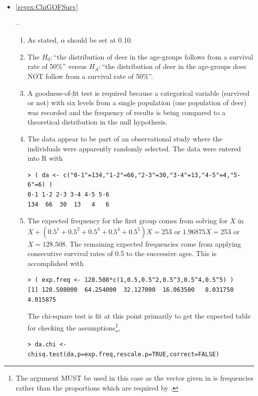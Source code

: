 \documentclass[10pt,openany]{book}\usepackage[]{graphicx}\usepackage[]{color}
\makeatletter
\newenvironment{kframe}{%
 \def\at@end@of@kframe{}%
 \ifinner\ifhmode%
  \def\at@end@of@kframe{\end{minipage}}%
  \begin{minipage}{\columnwidth}%
 \fi\fi%
 \def\FrameCommand##1{\hskip\@totalleftmargin \hskip-\fboxsep
 \colorbox{shadecolor}{##1}\hskip-\fboxsep
     \hskip-\linewidth \hskip-\@totalleftmargin \hskip\columnwidth}%
 \MakeFramed {\advance\hsize-\width
   \@totalleftmargin\z@ \linewidth\hsize
   \@setminipage}}%
 {\par\unskip\endMakeFramed%
 \at@end@of@kframe}
\newenvironment{knitrout}{}{} %
\makeatother
\begin{document}
\begin{itemize}
  \item \hypertarget{ans:ChiGOFSurv}{\ref{revex:ChiGOFSurv}} --
    \begin{enumerate}
      \item As stated, $\alpha$ should be set at 0.10.
      \item The $H_{0}:$``the distribution of deer in the age-groups follows from a survival rate of 50\%'' versus $H_{A}:$``the distribution of deer in the age-groups does NOT follow from a survival rate of 50\%''.
      \item A goodness-of-fit test is required because a categorical variable (survived or not) with six levels from a single population (one population of deer) was recorded and the frequency of results is being compared to a theoretical distribution in the null hypothesis.
      \item The data appear to be part of an observational study where the individuals were apparently randomly selected.  The data were entered into R with
\begin{knitrout}
\color{fgcolor}\begin{kframe}
\begin{verbatim}
> ( da <- c("0-1"=134,"1-2"=66,"2-3"=30,"3-4"=13,"4-5"=4,"5-6"=6) )
0-1 1-2 2-3 3-4 4-5 5-6 
134  66  30  13   4   6 
\end{verbatim}
\end{kframe}
\end{knitrout}
      \item The expected frequency for the first group comes from solving for $X$ in $X+(0.5^{1}+0.5^{2}+0.5^{3}+0.5^{4}+0.5^{5})X =$253 or $1.96875X=$253 or $X=128.508$.  The remaining expected frequencies come from applying consecutive survival rates of 0.5 to the successive ages.  This is accomplished with
\begin{knitrout}
\color{fgcolor}\begin{kframe}
\begin{verbatim}
> ( exp.freq <- 128.508*c(1,0.5,0.5^2,0.5^3,0.5^4,0.5^5) )
[1] 128.508000  64.254000  32.127000  16.063500   8.031750   4.015875
\end{verbatim}
\end{kframe}
\end{knitrout}
The chi-square test is fit at this point primarily to get the expected table for checking the assumptions\footnote{The  argument MUST be used in this case as the vector given in  is frequencies rather than the proportions which are required by .},
\begin{knitrout}
\color{fgcolor}\begin{kframe}
\begin{verbatim}
> da.chi <- chisq.test(da,p=exp.freq,rescale.p=TRUE,correct=FALSE)
\end{verbatim}



\end{kframe}
\end{knitrout}
\end{enumerate}
\end{itemize}
\end{document}
